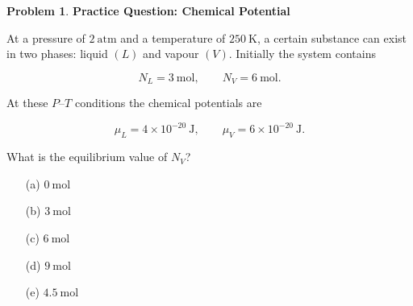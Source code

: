 \documentclass[12pt]{article}
\theoremstyle{definition} %
\newtheorem{problem}{Problem}
\theoremstyle{plain} %
\begin{document}
                          \begin{problem}
                            \textbf{Practice Question: Chemical Potential}
                          
                            At a pressure of \(2\ \text{atm}\) and a temperature of \(250\ \text{K}\),
                            a certain substance can exist in two phases: liquid \((L)\) and
                            vapour \((V)\).
                            Initially the system contains
                          
                            \[
                              N_L = 3\ \text{mol}, \qquad N_V = 6\ \text{mol}.
                            \]
                          
                            At these \(P\)–\(T\) conditions the chemical potentials are
                          
                            \[
                              \mu_L = 4 \times 10^{-20}\ \text{J}, \qquad
                              \mu_V = 6 \times 10^{-20}\ \text{J}.
                            \]
                          
                            \medskip
                            What is the equilibrium value of \(N_V\)?
                          
                            \begin{enumerate}
                              \item[(a)] \(0\ \text{mol}\)
                              \item[(b)] \(3\ \text{mol}\)
                              \item[(c)] \(6\ \text{mol}\)
                              \item[(d)] \(9\ \text{mol}\)
                              \item[(e)] \(4.5\ \text{mol}\)
                            \end{enumerate}
                          \end{problem}
\end{document}

